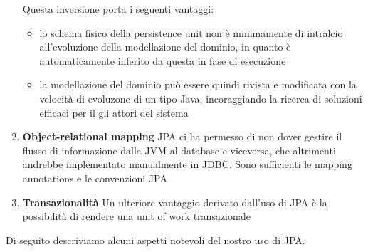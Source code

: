 \begin{enumerate}
          Questa inversione porta i seguenti vantaggi:
          \begin{itemize}
              \item lo schema fisico della persistence unit non è minimamente di intralcio 
                    all'evoluzione della modellazione del dominio, in quanto è automaticamente 
                    inferito da questa in fase di esecuzione
              \item la modellazione del dominio può essere quindi rivista e modificata con la
                    velocità di evoluzone di un tipo Java, incoraggiando la ricerca di
                    soluzioni efficaci per il gli attori del sistema
          \end{itemize}

    \item \textbf{Object-relational mapping} \newline
          JPA ci ha permesso di non dover gestire il flusso di informazione dalla JVM al database e viceversa,
          che altrimenti andrebbe implementato manualmente in JDBC. Sono sufficienti le mapping annotations
          e le convenzioni JPA
    \item \textbf{Transazionalità} \newline
          Un ulteriore vantaggio derivato dall'uso di JPA è la possibilità di rendere una unit of work
          transazionale
\end{enumerate}

Di seguito descriviamo alcuni aspetti notevoli del nostro uso di JPA.

